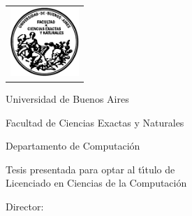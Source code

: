 \newcommand{\HRule}{\rule{\linewidth}{0.2mm}}
%
\thispagestyle{empty}

\begin{center}\leavevmode

\vspace{-2cm}

\begin{tabular}{l}
\includegraphics[width=2.6cm]{logofcen.pdf}
\end{tabular}


{\large \sc Universidad de Buenos Aires

Facultad de Ciencias Exactas y Naturales

Departamento de Computaci\'on}

\vspace{6.0cm}


{\huge\bf \titulo}

\vspace{2cm}

{\large Tesis presentada para optar al t\'{\i}tulo de\\
Licenciado en Ciencias de la Computaci\'on}

\vspace{2cm}

{\Large \autor}

\end{center}

\vfill

{\large

{Director: \director}

\vspace{.2cm}



\lugar
}

\newpage\thispagestyle{empty}
